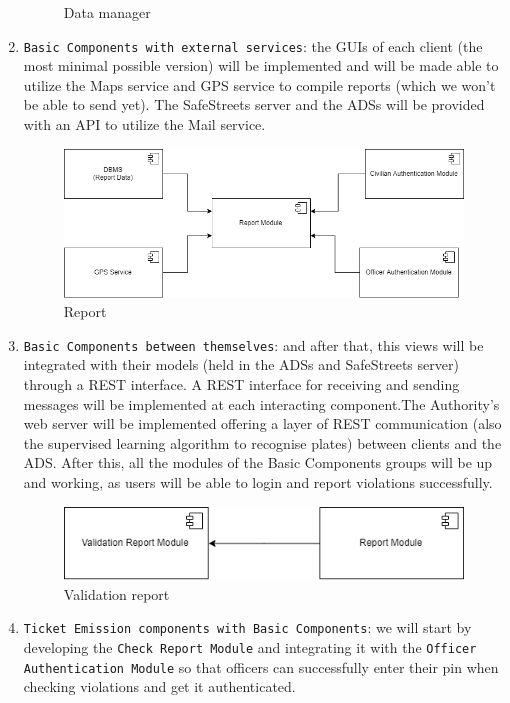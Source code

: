 \documentclass[12pt,a4paper]{article}
\begin{document}
\begin{enumerate}
\begin{figure}[H]
		\caption{Data manager}
\end{figure}
\item \texttt{Basic Components with external services}: the GUIs of each client (the most minimal possible version) will be implemented and will be made able to utilize the Maps service and GPS service to compile reports (which we won't be able to send yet). The SafeStreets server and the ADSs will be provided with an API to utilize the Mail service.
\\
\begin{figure}[H]
		\centering
			\includegraphics[width=1.0\linewidth]{Images/Integration/BasicIntegrationChart4}
		\caption{Report}
\end{figure}
\item \texttt{Basic Components between themselves}: and after that, this views will be integrated with their models (held in the ADSs and SafeStreets server) through a REST interface. A REST interface for receiving and sending messages will be implemented at each interacting component.The Authority's web server will be implemented offering a layer of REST communication (also the supervised learning algorithm to recognise plates) between clients and the ADS. After this, all the modules of the Basic Components groups will be up and working, as users will be able to login and report violations successfully.
\begin{figure}[H]
		\centering
			\includegraphics[width=1.0\linewidth]{Images/Integration/BasicIntegrationChart5}
		\caption{Validation report}
\end{figure}
\item \texttt{Ticket Emission components with Basic Components}: we will start by developing the \texttt{Check Report Module} and integrating it with the \texttt{Officer Authentication Module} so that officers can successfully enter their pin when checking violations and get it authenticated.

\end{enumerate}
\end{document}
